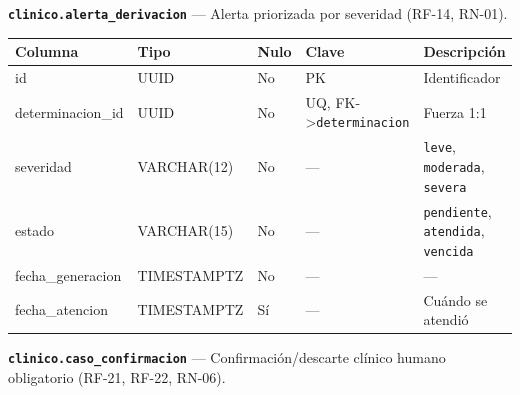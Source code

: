 \documentclass[11pt,a4paper]{article}
\begin{document}
\textbf{\texttt{clinico.alerta\_derivacion}} --- Alerta priorizada por severidad (RF-14, RN-01).

{\small
\begin{longtable}[]{@{}lllll@{}}
\toprule\noalign{}
Columna & Tipo & Nulo & Clave & Descripción \\
\midrule\noalign{}
\endhead
\bottomrule\noalign{}
\endlastfoot
id & UUID & No & PK & Identificador \\
determinacion\_id & UUID & No & UQ, FK-\textgreater{}\texttt{determinacion} & Fuerza 1:1 \\
severidad & VARCHAR(12) & No & --- & \texttt{leve}, \texttt{moderada}, \texttt{severa} \\
estado & VARCHAR(15) & No & --- & \texttt{pendiente}, \texttt{atendida}, \texttt{vencida} \\
fecha\_generacion & TIMESTAMPTZ & No & --- & --- \\
fecha\_atencion & TIMESTAMPTZ & Sí & --- & Cuándo se atendió \\
\end{longtable}
}

\textbf{\texttt{clinico.caso\_confirmacion}} --- Confirmación/descarte clínico humano obligatorio (RF-21, RF-22, RN-06).
\end{document}
